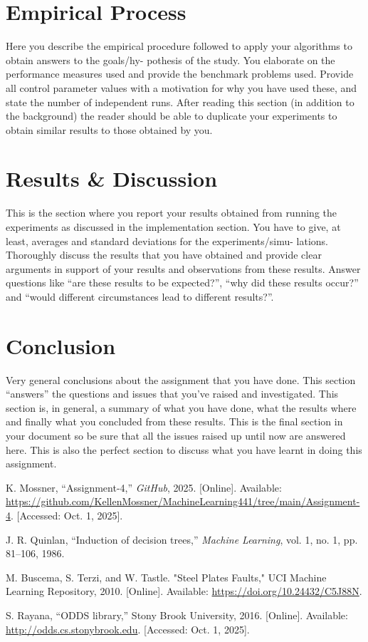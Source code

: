 \documentclass[conference]{IEEEtran}
\begin{document}
	\section{Empirical Process}\label{EP}
	Here you describe the empirical procedure followed to apply your algorithms to obtain answers to the goals/hy-
	pothesis of the study. You elaborate on the performance measures used and provide the benchmark problems
	used. Provide all control parameter values with a motivation for why you have used these, and state the number
	of independent runs. After reading this section (in addition to the background) the reader should be able to
	duplicate your experiments to obtain similar results to those obtained by you.
	
	\section{Results \& Discussion}\label{RD}
	This is the section where you report your results obtained from running the experiments as discussed in the
	implementation section. You have to give, at least, averages and standard deviations for the experiments/simu-
	lations. Thoroughly discuss the results that you have obtained and provide clear arguments in support of your
	results and observations from these results. Answer questions like “are these results to be expected?”, “why did
	these results occur?” and “would different circumstances lead to different results?”.
	
	\section{Conclusion}\label{C}
	Very general conclusions about the assignment that you have done. This section “answers” the questions and
	issues that you’ve raised and investigated. This section is, in general, a summary of what you have done, what
	the results where and finally what you concluded from these results. This is the final section in your document
	so be sure that all the issues raised up until now are answered here. This is also the perfect section to discuss
	what you have learnt in doing this assignment.
	
	\begin{thebibliography}{00}
		
		K. Mossner, ``Assignment-4,'' \textit{GitHub}, 2025. [Online]. Available: \url{https://github.com/KellenMossner/MachineLearning441/tree/main/Assignment-4}. [Accessed: Oct. 1, 2025].
		
		J. R. Quinlan, ``Induction of decision trees,'' \textit{Machine Learning}, vol. 1, no. 1, pp. 81--106, 1986.
		
		M. Buscema, S. Terzi, and W. Tastle. "Steel Plates Faults," UCI Machine Learning Repository, 2010. [Online]. Available: \url{https://doi.org/10.24432/C5J88N}.
		
		S. Rayana, ``ODDS library,'' Stony Brook University, 2016. [Online]. Available: \url{http://odds.cs.stonybrook.edu}. [Accessed: Oct. 1, 2025].
		
	\end{thebibliography}

	
\end{document}
